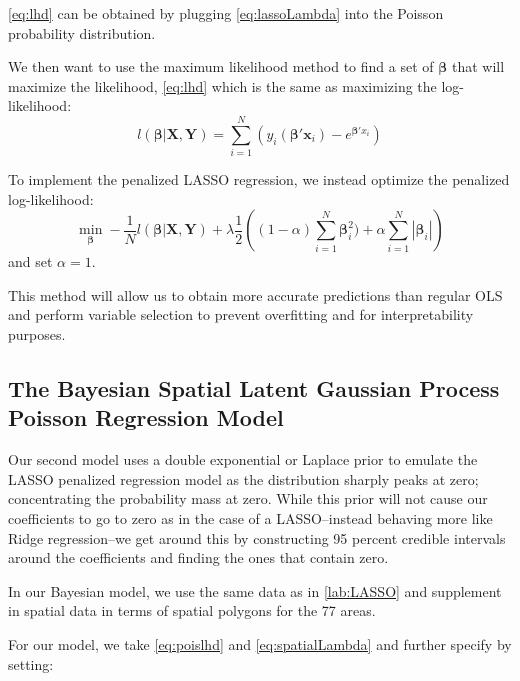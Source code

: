 \documentclass{article} %
\begin{document}
\autoref{eq:lhd} can be obtained by plugging \autoref{eq:lassoLambda} into the Poisson probability distribution. 

We then want to use the maximum likelihood method to find a set of $\boldsymbol{\beta}$ that will maximize the likelihood, \autoref{eq:lhd} which is the same as maximizing the log-likelihood:
\begin{equation}
\label{eq:loglhd}
l(\boldsymbol{\beta}|\mathbf{X}, \mathbf{Y}) = \sum_{i=1}^N (y_i (\boldsymbol{\beta}' \mathbf{x}_i) - e^{\boldsymbol{\beta}'x_i})
\end{equation}

To implement the penalized LASSO regression, we instead optimize the penalized log-likelihood:
\begin{equation}
\label{eq:penalloglhd}
\min_{\boldsymbol{\beta}} -\frac1N l(\boldsymbol{\beta}|\mathbf{X}, \mathbf{Y})  + \lambda \frac{1}{2} \left((1-\alpha) \sum_{i=1}^N \boldsymbol{\beta}_i^2) +\alpha \sum_{i=1}^N |\boldsymbol{\beta}_i|\right)
\end{equation}
and set $\alpha = 1$.

This method will allow us to obtain more accurate predictions than regular OLS and perform variable selection to prevent overfitting and for interpretability purposes. 






\subsection{The Bayesian Spatial Latent Gaussian Process Poisson Regression Model}

Our second model uses a double exponential or Laplace prior to emulate the LASSO penalized regression model as the distribution sharply peaks at zero; concentrating the probability mass at zero. While this prior will not cause our coefficients to go to zero as in the case of a LASSO--instead behaving more like Ridge regression--we get around this by constructing 95 percent credible intervals around the coefficients and finding the ones that contain zero. 

In our Bayesian model, we use the same data as in \autoref{lab:LASSO} and supplement in spatial data in terms of spatial polygons for the 77 areas. 

For our model, we take \autoref{eq:poislhd} and \autoref{eq:spatialLambda} and further specify by setting: 
\end{document}
